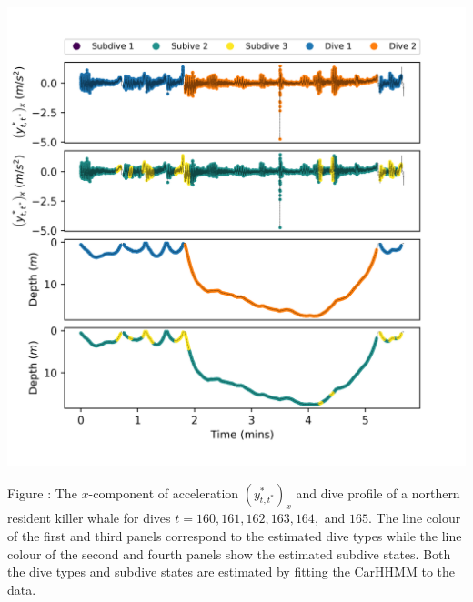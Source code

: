 \documentclass{article}
\begin{document}
        \begin{center}
        \includegraphics[width=6in]{../Plots/CarHHMM1_decoded_dives.png}
        \end{center}
        
        \noindent Figure : The $x$-component of acceleration $\left(y^*_{t,t^*}\right)_x$ and dive profile of a northern resident killer whale for dives $t = 160,161,162,163,164,$ and $165$. The line colour of the first and third panels correspond to the estimated dive types while the line colour of the second and fourth panels show the estimated subdive states. Both the dive types and subdive states are estimated by fitting the CarHHMM to the data.
        \addtocounter{fignum}{1}
        
\end{document}
